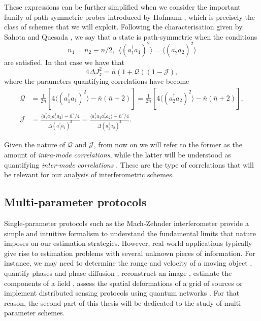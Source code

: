 These expressions can be further simplified when we consider the important family of path-symmetric probes introduced by Hofmann \cite{HofmannHolger2009}, which is precisely the class of schemes that we will exploit. Following the characterisation given by Sahota and Quesada \cite{sahota2015}, we say that a state is path-symmetric when the conditions
\begin{equation}
\bar{n}_1 = \bar{n}_2 \equiv \bar{n}/2, ~~ \langle (a_1^\dagger a_1)^2\rangle = \langle (a_2^\dagger a_2)^2\rangle
\end{equation}
are satisfied. In that case we have that 
\begin{equation}
4\Delta J_z^2 = \bar{n}(1+\mathcal{Q})(1-\mathcal{J}),
\label{fishercorrpathsym}
\end{equation}
where the parameters quantifying correlations have become
\begin{align}
\mathcal{Q} &= \frac{1}{2\bar{n}}\left[4\langle (a_1^\dagger a_1)^2 \rangle - \bar{n}\left(\bar{n} + 2\right)\right] = \frac{1}{2\bar{n}}\left[4\langle (a_2^\dagger a_2)^2 \rangle - \bar{n}\left(\bar{n} + 2\right)\right],
\nonumber \\
\mathcal{J} &= \frac{\langle a_1^\dagger a_1 a_2^\dagger a_2 \rangle - \bar{n}^2/4}{\Delta(a_1^\dagger a_1)^2}  = \frac{\langle a_1^\dagger a_1 a_2^\dagger a_2 \rangle - \bar{n}^2/4}{\Delta(a_2^\dagger a_2)^2}.
\label{correlationsintro}
\end{align}

Given the nature of $\mathcal{Q}$ and $\mathcal{J}$, from now on we will refer to the former as the amount of \emph{intra-mode correlations}, while the latter will be understood as quantifying \emph{inter-mode correlations} \cite{knott2016local, proctor2017networked}. These are the type of correlations that will be relevant for our analysis of interferometric schemes. 

\subsection{Multi-parameter protocols}
\label{subsec:multischemes}

Single-parameter protocols such as the Mach-Zehnder interferometer provide a simple and intuitive formalism to understand the fundamental limits that nature imposes on our estimation strategies. However, real-world applications typically give rise to estimation problems with several unknown pieces of information. For instance, we may need to determine the range and velocity of a moving object \cite{zhuang2017}, quantify phases and phase diffusion \cite{vidrighin2014, szczykulska2017}, reconstruct an image \cite{humphreys2013, knott2016local, zhang_lu2017}, estimate the components of a field \cite{baumgratz2016}, assess the spatial deformations of a grid of sources \cite{jasminder2016, jasminder2018} or implement distributed sensing protocols using quantum networks \cite{proctor2017networked, proctor2017networkedshort, ge2018, eldredge2018, altenburg2018, qian2019}. For that reason, the second part of this thesis will be dedicated to the study of multi-parameter schemes. 

